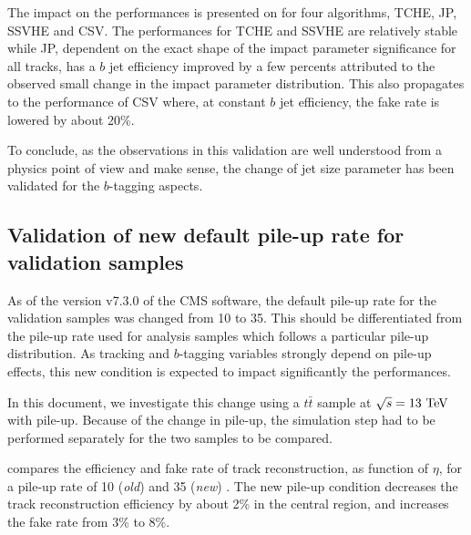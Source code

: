     The impact on the performances is presented on 
    for four algorithms, TCHE, JP, SSVHE and CSV. The performances for TCHE and SSVHE
    are relatively stable while JP, dependent on the exact shape of the impact parameter
    significance for all tracks, has a $b$ jet efficiency improved by a few percents attributed to the
    observed small change in the impact parameter distribution. This also propagates to the
    performance of CSV where, at constant $b$ jet efficiency, the fake rate is lowered
    by about 20\%.

    To conclude, as the observations in this validation are well understood from a physics
    point of view and make sense, the change of jet size parameter has been validated for
    the $b$-tagging aspects.

    \subsection{Validation of new default pile-up rate for validation samples}

    As of the version v7.3.0 of the CMS software, the default pile-up rate for the validation
    samples was changed from 10 to 35. This should be differentiated from the pile-up rate
    used for analysis samples which follows a particular pile-up distribution.
    As tracking and $b$-tagging variables strongly depend on pile-up effects, this
    new condition is expected to impact significantly the performances.

    In this document, we investigate this change using a $t\bar{t}$ sample at $\sqrt{s} = 13~\text{TeV}$
    with pile-up. Because of the change in pile-up, the simulation step had to be performed
    separately for the two samples to be compared.

     compares the efficiency and fake rate of track
    reconstruction, as function of $\eta$, for a pile-up rate of 10 (\emph{old}) and
    35 (\emph{new}) \cite{TrackingNewPUComparison}. The new pile-up condition decreases the track reconstruction
    efficiency by about 2\% in the central region, and increases the fake rate from
    3\% to 8\%.


